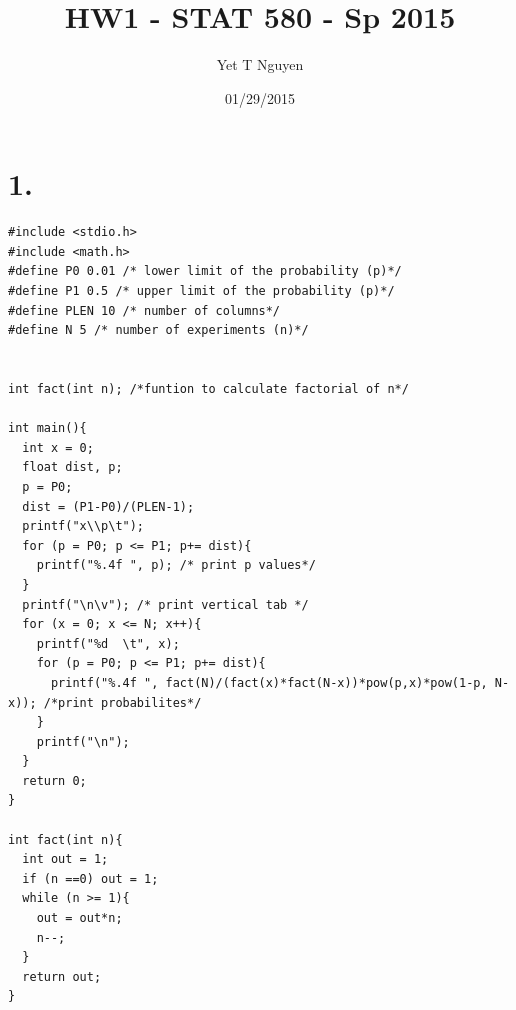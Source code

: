 \documentclass{article}\usepackage[]{graphicx}\usepackage[]{color}
\begin{document}
\title{\color{red}HW1 - STAT 580 - Sp 2015}
\author{Yet T Nguyen}
\date{01/29/2015}
\maketitle

\section*{1.}
\begin{verbatim}
#include <stdio.h>
#include <math.h>
#define P0 0.01 /* lower limit of the probability (p)*/
#define P1 0.5 /* upper limit of the probability (p)*/
#define PLEN 10 /* number of columns*/
#define N 5 /* number of experiments (n)*/


int fact(int n); /*funtion to calculate factorial of n*/

int main(){
  int x = 0; 
  float dist, p;
  p = P0;
  dist = (P1-P0)/(PLEN-1);
  printf("x\\p\t"); 
  for (p = P0; p <= P1; p+= dist){
    printf("%.4f ", p); /* print p values*/
  }
  printf("\n\v"); /* print vertical tab */
  for (x = 0; x <= N; x++){
    printf("%d  \t", x);
    for (p = P0; p <= P1; p+= dist){
      printf("%.4f ", fact(N)/(fact(x)*fact(N-x))*pow(p,x)*pow(1-p, N-x)); /*print probabilites*/
    }
    printf("\n");
  }
  return 0;
}

int fact(int n){
  int out = 1;
  if (n ==0) out = 1;
  while (n >= 1){
    out = out*n;
    n--;
  }
  return out;
}
\end{verbatim}
% 
% 
\end{document}
